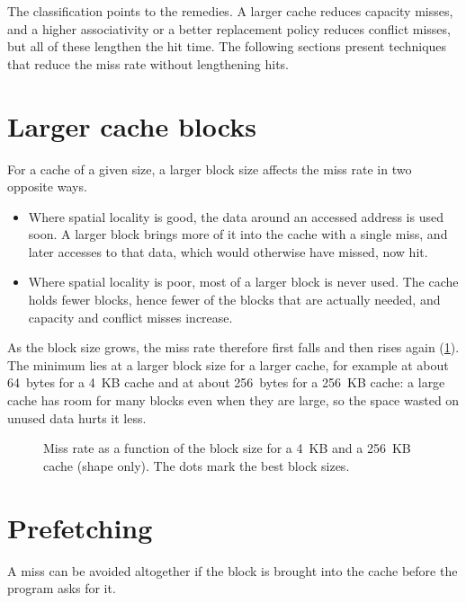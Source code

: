 \documentclass[../main.tex]{subfiles}
\begin{document}
The classification points to the remedies.  A larger cache reduces capacity
misses, and a higher associativity or a better replacement policy reduces
conflict misses, but all of these lengthen the hit time.  The following
sections present techniques that reduce the miss rate without lengthening
hits.

\section{Larger cache blocks}
\label{sec:l14-block-size}

For a cache of a given size, a larger block size affects the miss rate in two
opposite ways.
\begin{itemize}
  \item Where spatial locality is good, the data around an accessed address
    is used soon.  A larger block brings more of it into the cache with a
    single miss, and later accesses to that data, which would otherwise have
    missed, now hit.
  \item Where spatial locality is poor, most of a larger block is never used.
    The cache holds fewer blocks, hence fewer of the blocks that are actually
    needed, and capacity and conflict misses increase.
\end{itemize}
As the block size grows, the miss rate therefore first falls and then rises
again (\cref{fig:l14-block-size}).  The minimum lies at a larger block size
for a larger cache, for example at about 64~bytes for a 4~KB cache and at
about 256~bytes for a 256~KB cache: a large cache has room for many blocks
even when they are large, so the space wasted on unused data hurts it less.

\begin{figure}[htbp]
  \centering
  
  \caption{Miss rate as a function of the block size for a 4~KB and a 256~KB
    cache (shape only).  The dots mark the best block sizes.}
  \label{fig:l14-block-size}
\end{figure}

\section{Prefetching}
\label{sec:l14-prefetching}

A miss can be avoided altogether if the block is brought into the cache
before the program asks for it.
\end{document}
